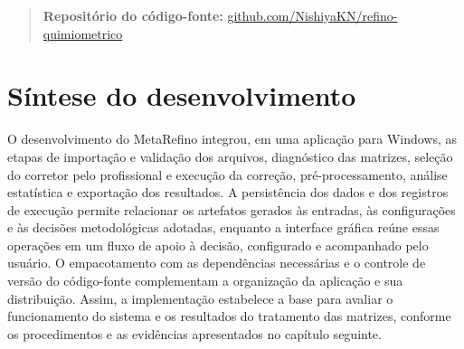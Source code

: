 \begin{quote}
    \textbf{Repositório do código-fonte:} \url{github.com/NishiyaKN/refino-quimiometrico}
\end{quote}

\section{Síntese do desenvolvimento}

O desenvolvimento do MetaRefino integrou, em uma aplicação para Windows, as etapas de importação e validação dos arquivos, diagnóstico das matrizes, seleção do corretor pelo profissional e execução da correção, pré-processamento, análise estatística e exportação dos resultados. A persistência dos dados e dos registros de execução permite relacionar os artefatos gerados às entradas, às configurações e às decisões metodológicas adotadas, enquanto a interface gráfica reúne essas operações em um fluxo de apoio à decisão, configurado e acompanhado pelo usuário. O empacotamento com as dependências necessárias e o controle de versão do código-fonte complementam a organização da aplicação e sua distribuição. Assim, a implementação estabelece a base para avaliar o funcionamento do sistema e os resultados do tratamento das matrizes, conforme os procedimentos e as evidências apresentados no capítulo seguinte.
